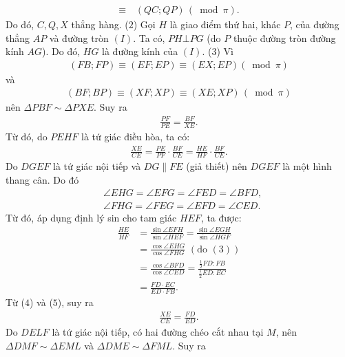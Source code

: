 \begin{multicols}{2}
\begin{align*}
		\equiv \,&(QC; QP) \,(\!\bmod \pi).
	\end{align*}
	Do đó, $C, Q, X$ thẳng hàng. \hfill ($2$)
	\vskip 0.05cm
	Gọi $H$ là giao điểm thứ hai, khác $P$, của đường thẳng $AP$ và đường tròn $(I)$. Ta có, $PH \bot PG$ (do $P$ thuộc đường tròn đường kính $AG$). Do đó, $HG$ là đường kính \linebreak của $(I)$. \hfill ($3$)
	\vskip 0.05cm
	Vì
	\begin{align*}
		\left( {FB;FP} \right) \equiv \left( {EF;EP} \right) \equiv \left( {EX;EP} \right)\left( {\bmod \pi } \right)
	\end{align*}
	và  
	\begin{align*}
		\left( {BF;BP} \right) \equiv \left( {XF;XP} \right) \equiv \left( {XE;XP} \right)\,\left( {\!\bmod \pi } \right)
	\end{align*}                                       
	nên $\Delta PBF \sim \Delta PXE$. Suy ra
	\begin{align*}
		\frac{{PF}}{{PE}} = \frac{{BF}}{{XE}}.
	\end{align*}
	Từ đó, do $PEHF$ là tứ giác điều hòa, ta có:
	\begin{align*}
		\frac{{XE}}{{CE}} = \frac{{PE}}{{PF}} \cdot \frac{{BF}}{{CE}} = \frac{{HE}}{{HF}} \cdot \frac{{BF}}{{CE}}. \tag{$4$}
	\end{align*}
	Do $DGEF$ là tứ giác nội tiếp và $DG \parallel FE$ (giả thiết) nên $DGEF$ là một hình thang cân. Do đó
	\begin{align*}
			&\angle EHG = \angle EFG = \angle FED = \angle BFD,\\
			&\angle FHG = \angle FEG = \angle EFD = \angle CED.
	\end{align*}
	Từ đó, áp dụng định lý sin cho tam giác $HEF$, ta được:
	\begin{align*}
		\frac{{HE}}{{HF}} &= \frac{{\sin \angle EFH}}{{\sin \angle HEF}} = \frac{{\sin \angle EGH}}{{\sin \angle HGF}} \\
		&= \frac{{\cos \angle EHG}}{{\cos \angle FHG}} \,\,({\text{do }}(3))\\
		&= \frac{{\cos \angle BFD}}{{\cos \angle CED}} = \frac{{\frac{1}{2}FD:FB}}{{\frac{1}{2}ED:EC}} \\
		&= \frac{{FD \cdot EC}}{{ED \cdot FB}}. \tag{$5$}
	\end{align*}
	Từ ($4$) và ($5$), suy ra
	\begin{align*}
		\frac{{XE}}{{CE}} = \frac{{FD}}{{ED}}. \tag{$6$}
	\end{align*}
	Do $DELF$ là tứ giác nội tiếp, có hai đường chéo cắt nhau tại $M$, nên $\Delta DMF \sim \Delta EML$ và $\Delta DME \sim \Delta FML$. Suy ra

\end{multicols}
